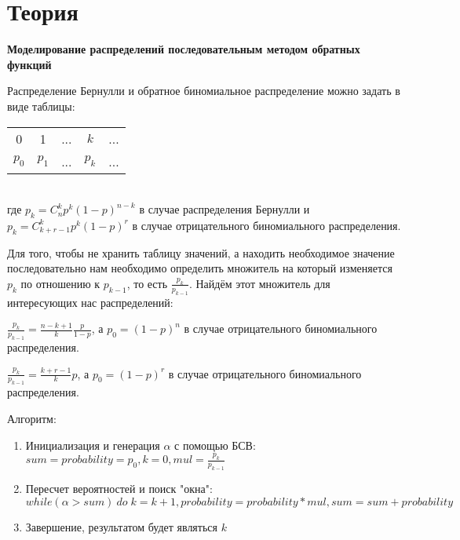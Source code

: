 \documentclass[12pt]{article}
\begin{document}
	\section*{Теория}
	\par \textbf{Моделирование распределений последовательным методом обратных функций} 
	\par Распределение Бернулли и обратное биномиальное распределение можно задать в виде таблицы: \par
	\begin{tabular}{c c c c c}
		\hline
		0 & 1 & ... & $ k $ & ... \\
		$ p_0 $ & $ p_1 $ & ... & $ p_k $ & ... \\
		\hline
	\end{tabular}
	\\ где $ p_k = C^{k}_{n}p^k(1-p)^{n-k} $ в случае распределения Бернулли и $ p_k = C^{k}_{k+r-1}p^k(1-p)^r $ в случае отрицательного биномиального распределения.
	\par Для того, чтобы не хранить таблицу значений, а находить необходимое значение последовательно нам необходимо определить множитель на который изменяется $ p_k $ по отношению к $ p_{k-1} $, то есть $ \frac{p_k}{p_{k-1}} $. Найдём этот множитель для интересующих нас распределений:
	\par $ \frac{p_k}{p_{k-1}} = \frac{n-k+1}{k} \frac{p}{1-p} $, а $ p_0 = (1-p)^n $ в случае отрицательного биномиального распределения.
	\par $ \frac{p_k}{p_{k-1}} = \frac{k+r-1}{k}p $, а $ p_0 = (1-p)^r $ в случае отрицательного биномиального распределения.
	\par Алгоритм: \\
	\begin{enumerate}
		\item Инициализация и генерация $ \alpha $ с помощью БСВ: $ sum=probability=p_0, k=0, mul=\frac{p_k}{p_{k-1}} $
		\item Пересчет вероятностей и поиск "окна": $ while(\alpha > sum)\: do\; k=k+1, probability=probability*mul, sum=sum+probability $
		\item Завершение, результатом будет являться $ k $
	\end{enumerate}		
	
\end{document}
